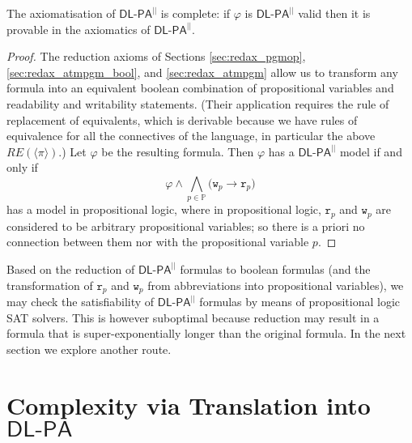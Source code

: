\documentclass{llncs}
\newcommand{\pll}{ {||} }							%
\newcommand{\readable}[1]{\mathtt{r}_{#1}}
\newcommand{\writable}[1]{\mathtt{w}_{#1}}
\newcommand{\Dlpa}{\ensuremath{\mathsf{DL\text{-}PA}}\xspace}
\newcommand{\DlpaPll}{\ensuremath{\mathsf{DL\text{-}PA}^\pll}\xspace}
\newcommand{\assgnbotV}[1]{{\mathtt {-} #1}}
\newcommand{\ldia}[1]{ \big\langle #1 \big\rangle}
\newcommand{\leqv}{ \leftrightarrow }
\newcommand{\limp}{ \rightarrow }
\renewcommand{\phi}{\varphi}
\newcommand{\propset}{\mathbb P}
\begin{document}
\begin{theorem}
The axiomatisation of \DlpaPll is complete:
if $\phi$ is \DlpaPll valid then it is provable in the axiomatics of \DlpaPll. 
\end{theorem}
\begin{proof}
The reduction axioms of Sections \ref{sec:redax_pgmop}, \ref{sec:redax_atmpgm_bool}, and \ref{sec:redax_atmpgm} 
allow us to transform any formula into an equivalent boolean combination of 
propositional variables and readability and writability statements. 
(Their application requires the rule of replacement of equivalents, which is derivable 
because we have rules of equivalence for all the connectives of the language, 
in particular the above $RE(\ldia \pi)$.)
Let $\phi$ be the resulting formula. 
Then $\phi$ has a \DlpaPll model if and only if 
$$\phi \land 
\bigwedge_{p \in \propset} \big( \writable{p} \limp \readable p \big) $$
has a model in propositional logic, where in propositional logic,
$\readable p$ and $\writable{p}$ are considered to be arbitrary propositional variables; so
there is a priori no connection between them nor with the propositional variable $p$. 
\end{proof}


Based on the reduction of \DlpaPll formulas to boolean formulas 
(and the transformation of $\readable p$ and $\writable{p}$ from abbreviations into propositional variables),
we may check the satisfiability of \DlpaPll formulas by means of propositional logic SAT solvers. 
This is however suboptimal because reduction may result in a formula that is super-exponentially longer than the original formula. 
In the next section we explore another route.


\section{Complexity via Translation into \Dlpa}\label{sec:complexity}
\end{document}
